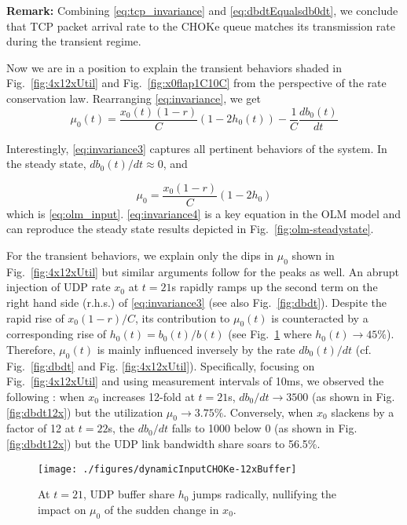 \documentclass{IEEEtran}
\begin{document}
    {\bf Remark:} Combining  \eqref{eq:tcp_invariance} and \eqref{eq:dbdtEqualsdb0dt}, we conclude that TCP packet arrival rate to the CHOKe queue matches its transmission rate during the transient regime.

    Now we are in a position to explain the transient behaviors shaded in Fig.~\ref{fig:4x12xUtil} and Fig.~\ref{fig:x0flap1C10C}  from the perspective of the rate conservation law. Rearranging \eqref{eq:invariance},  we get \begin{equation}\label{eq:invariance3}
            \mu_0(t) = \frac{x_0(t)(1-r)}{C} ( 1-2h_0(t)) -\frac{1}{C}\frac{db_0(t)}{dt}
        \end{equation}

    Interestingly, \eqref{eq:invariance3} captures all pertinent behaviors of the system. In the steady state, $db_0(t)/dt\approx0$, and

        \begin{equation}\label{eq:invariance4}
            \mu_0 = \frac{x_0(1-r)}{C} ( 1-2h_0)
        \end{equation}
 which is \eqref{eq:olm_input}. \eqref{eq:invariance4} is a key equation in the OLM  model and can reproduce the steady state results depicted in Fig.~\ref{fig:olm-steadystate}.

For the transient behaviors, we explain only the dips in $\mu_0$ shown in Fig.~\ref{fig:4x12xUtil} but similar arguments follow for the peaks as well. An abrupt injection of UDP rate $x_0$ at $t=21$s rapidly ramps up the second term on the right hand side (r.h.s.) of \eqref{eq:invariance3} (see also Fig.~\ref{fig:dbdt}). Despite the rapid rise of $x_0(1-r)/C$, its contribution to $\mu_0(t)$ is counteracted by a corresponding rise of $h_0(t)=b_0(t)/b(t)$ (see Fig.~\ref{fig:12BufferChange} where $h_0(t)\rightarrow 45 \%$). Therefore, $\mu_0(t)$ is mainly  influenced inversely by the rate $db_0(t)/dt$ (cf. Fig.~\ref{fig:dbdt} and Fig. \ref{fig:4x12xUtil}). Specifically, focusing on Fig.~\ref{fig:4x12xUtil}  and using measurement intervals of 10ms, we observed the following : when $x_0$ increases 12-fold at $t=21$s, $db_0/dt \rightarrow  3500$ (as shown in Fig. \ref{fig:dbdt12x}) but the utilization $\mu_0 \rightarrow 3.75\%$. Conversely, when $x_0$ slackens by a factor of 12 at $t=22$s, the $db_0/dt$ falls to 1000 below $0$ (as shown in Fig. \ref{fig:dbdt12x}) but the UDP link bandwidth share soars to 56.5\%.

            \begin{figure}[tbh!]
            \centering
            \texttt{[image: ./figures/dynamicInputCHOKe-12xBuffer]}\caption{At $t=21$, UDP buffer share $h_0$ jumps radically, nullifying the impact on $\mu_0$ of the sudden change in  $x_0$.}
            \label{fig:12BufferChange}
    \end{figure}
\end{document}
